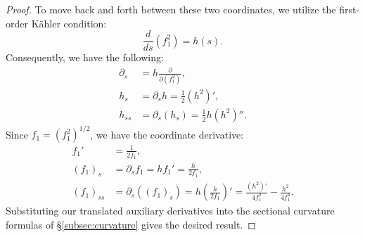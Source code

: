 \documentclass[11pt]{amsart}
\theoremstyle{plain}
\numberwithin{equation}{section}
\theoremstyle{definition}
\theoremstyle{remark}
\begin{document}
\begin{proof}
	To move back and forth between these two coordinates, we utilize the first-order Kähler condition:
	\begin{equation*}
		\frac{d}{ds}(f_1^2) = h(s).
	\end{equation*}
	Consequently, we have the following:
	\begin{align*}
		\partial_s &= h \frac{\partial}{\partial (f_1^2)},\\
		h_s &= \partial_s h = \frac{1}{2} (h^2)',\\
		h_{ss} &= \partial_s (h_s) = \frac{1}{2} h (h^2)''.
	\end{align*}
	Since $f_1 = (f_1^2)^{1/2}$, we have the coordinate derivative:
	\begin{align*}
		f_1' &= \frac{1}{2f_1},\\
		(f_1)_s &= \partial_s f_1 = h f_1' = \frac{h}{2f_1},\\
		(f_1)_{ss} &= \partial_s \left( (f_1)_s \right) = h \left( \frac{h}{2f_1} \right)'=\frac{(h^2)'}{4f_1^2} - \frac{h^2}{4f_1^4}.
	\end{align*}
	Substituting our translated auxiliary derivatives into the sectional curvature formulas of \S\ref{subsec:curvature} gives the desired result.
\end{proof}

\end{document}

